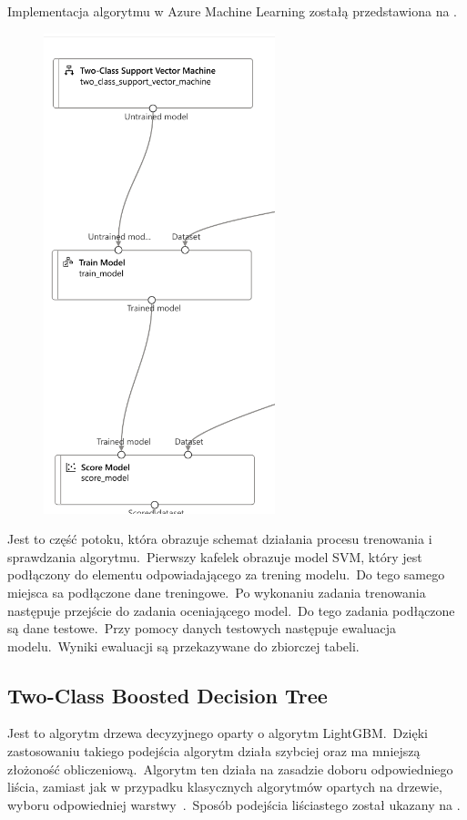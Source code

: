 Implementacja algorytmu w Azure Machine Learning zostałą przedstawiona na .

\begin{figure}[H]
    \centering
    \includegraphics[width=0.6\textwidth]{images/svm_pipe}
    \label{fig:svm-pipe}
\end{figure}

Jest to część potoku, która obrazuje schemat działania procesu trenowania i sprawdzania algorytmu.\ Pierwszy kafelek obrazuje model SVM, który jest podłączony do elementu odpowiadającego za trening modelu.\ Do tego samego miejsca sa podłączone dane treningowe.\ Po wykonaniu zadania trenowania następuje przejście do zadania oceniającego model.\ Do tego zadania podłączone są dane testowe.\ Przy pomocy danych testowych następuje ewaluacja modelu.\ Wyniki ewaluacji są przekazywane do zbiorczej tabeli.

\vfill
\pagebreak

\subsection{Two-Class Boosted Decision Tree}
Jest to algorytm drzewa decyzyjnego oparty o algorytm LightGBM.\ Dzięki zastosowaniu takiego podejścia algorytm działa szybciej oraz ma mniejszą złożoność obliczeniową.\ Algorytm ten działa na zasadzie doboru odpowiedniego liścia, zamiast jak w przypadku klasycznych algorytmów opartych na drzewie, wyboru odpowiedniej warstwy~\cite{LightGBM}.\ Sposób podejścia liściastego został ukazany na .

